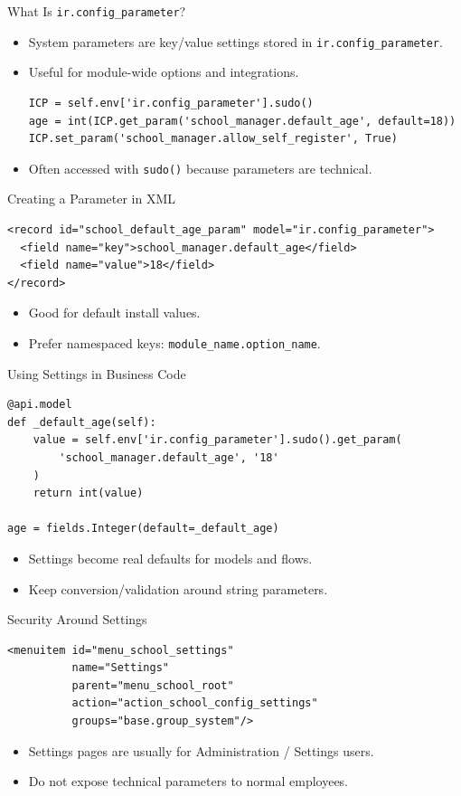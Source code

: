 \begin{frame}[fragile]{What Is \texttt{ir.config\_parameter}?}
	\begin{itemize}
		\item System parameters are key/value settings stored in \texttt{ir.config\_parameter}.
		\item Useful for module-wide options and integrations.
\begin{lstlisting}
ICP = self.env['ir.config_parameter'].sudo()
age = int(ICP.get_param('school_manager.default_age', default=18))
ICP.set_param('school_manager.allow_self_register', True)
\end{lstlisting}
		\item Often accessed with \texttt{sudo()} because parameters are technical.
	\end{itemize}
\end{frame}

\begin{frame}[fragile]{Creating a Parameter in XML}
\begin{lstlisting}[style=xml]
<record id="school_default_age_param" model="ir.config_parameter">
  <field name="key">school_manager.default_age</field>
  <field name="value">18</field>
</record>
\end{lstlisting}
	\begin{itemize}
		\item Good for default install values.
		\item Prefer namespaced keys: \texttt{module\_name.option\_name}.
	\end{itemize}
\end{frame}

\begin{frame}[fragile]{Using Settings in Business Code}
\begin{lstlisting}
@api.model
def _default_age(self):
	value = self.env['ir.config_parameter'].sudo().get_param(
		'school_manager.default_age', '18'
	)
	return int(value)

age = fields.Integer(default=_default_age)
\end{lstlisting}
	\begin{itemize}
		\item Settings become real defaults for models and flows.
		\item Keep conversion/validation around string parameters.
	\end{itemize}
\end{frame}

\begin{frame}[fragile]{Security Around Settings}
\begin{lstlisting}[style=xml]
<menuitem id="menu_school_settings"
		  name="Settings"
		  parent="menu_school_root"
		  action="action_school_config_settings"
		  groups="base.group_system"/>
\end{lstlisting}
	\begin{itemize}
		\item Settings pages are usually for Administration / Settings users.
		\item Do not expose technical parameters to normal employees.
	\end{itemize}
\end{frame}

